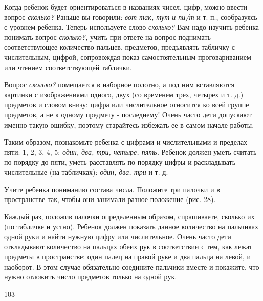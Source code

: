 \documentclass[a5paper]{book}
\renewcommand{\emph}[1]{\textit{#1}}
\begin{document}
Когда ребенок будет ориентироваться в названиях чисел, цифр, можно
ввести вопрос \emph{сколько?} Раньше вы говорили: \emph{вот так, тут и
пи/т} и т. п., сообразуясь с уровнем ребенка. Теперь используете слово
\emph{сколько?} Вам надо научить ребенка понимать вопрос
\emph{сколько?,} учить при ответе на вопрос поднимать соответствующее
количество пальцев, предметов, предъявлять табличку с числительным,
цифрой, сопровождая показ самостоятельным проговариванием или чтением
соответствующей таблички.

Вопрос \emph{сколько?} помещается в наборное полотно, а под ним
вставляются картинки с изображениями одного, двух (со временем трех,
четырех и т. д.) предметов и словом внизу: цифра или числительное
относится ко всей группе предметов, а не к одному предмету - последнему!
Очень часто дети допускают именно такую ошибку, поэтому старайтесь
избежать ее в самом начале работы.

Таким образом, познакомьте ребенка с цифрами и числительными и пределах
пяти: 1, 2, 3, 4, 5; \emph{один, два, три, четыре, пять.} Ребенок должен
уметь считать по порядку до пяти, уметь расставлять по порядку цифры и
раскладывать числительные (на табличках): \emph{один, два, три} и т. д.

Учите ребенка пониманию состава числа. Положите три палочки и в
пространстве так, чтобы они занимали разное положение (рис. 28).

Каждый раз, положив палочки определенным образом, спрашиваете, сколько
их (по табличке и устно). Ребенок должен показать данное количество на
пальчиках одной руки и найти нужную цифру или числительное. Очень часто
дети откладывают количество на пальцах обеих рук в соответствии с тем,
как лежат предметы в пространстве: один палец на правой руке и два
пальца на левой, и наоборот. В этом случае обязательно соедините
пальчики вместе и покажите, что нужно отложить число предметов только на
одной рук.

103
\end{document}
